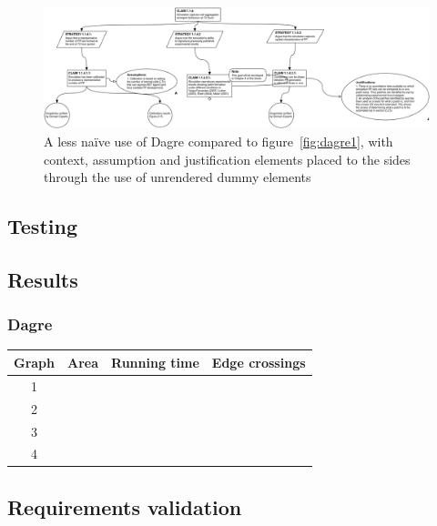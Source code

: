 \begin{figure}
  \centering
  \includegraphics[width=\textwidth]{graphics/results/a4-dagre-novel.png}
  \caption{A less na\"ive use of Dagre compared to figure~\ref{fig:dagre1}, with context, assumption and justification elements placed to the sides through the use of unrendered dummy elements}
  \label{fig:dagre2}
\end{figure}



\begin{landscape}

\section{Testing}



\subsection{Results}

\subsubsection{Dagre}

\begin{tabular}{ | c | c | c | c | }
    \hline
    Graph & Area & Running time & Edge crossings \\
    \hline
    1     & & & \\
    \hline
    2     & & & \\
    \hline
    3     & & & \\
    \hline
    4     & & & \\
    \hline
\end{tabular}



\end{landscape}


\subsection{Requirements validation}


